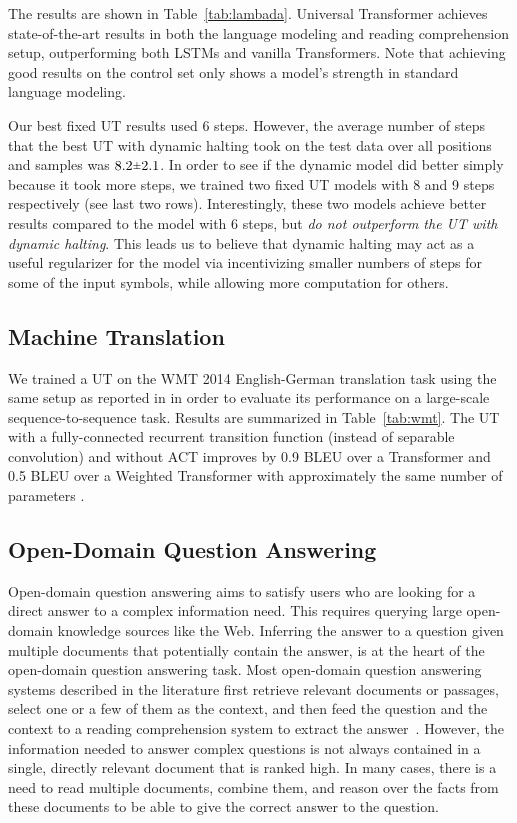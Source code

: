 

The results are shown in Table~\ref{tab:lambada}. Universal Transformer achieves state-of-the-art results in both the language modeling and reading comprehension setup, outperforming both LSTMs and vanilla Transformers. Note that achieving good results on the control set only shows a model's strength in standard language modeling.

Our best fixed UT results used 6 steps. However, the average number of steps that the best UT with dynamic halting took on the test data over all positions and samples was $8.2 \rpm 2.1$. In order to see if the dynamic model did better simply because it took more steps, we trained two fixed UT models with 8 and 9 steps respectively (see last two rows). Interestingly, these two models achieve better results compared to the model with 6 steps, but \emph{do not outperform the UT with dynamic halting}. This leads us to believe that dynamic halting may act as a useful regularizer for the model via incentivizing smaller numbers of steps for some of the input symbols, while allowing more computation for others.

\subsection{Machine Translation}
We trained a UT on the WMT 2014 English-German translation task using the same setup as reported in \citep{transformer} in order to evaluate its performance on a large-scale sequence-to-sequence task. Results are summarized in Table~\ref{tab:wmt}. The UT with a fully-connected recurrent transition function (instead of separable convolution) and without ACT improves by 0.9 BLEU over a Transformer and 0.5 BLEU over a Weighted Transformer with approximately the same number of parameters \citep{ahmed2017weighted}.



\subsection{Open-Domain Question Answering}
Open-domain question answering aims to satisfy users who are looking for a direct answer to a complex information need. 
This requires querying large open-domain knowledge sources like the Web. 
Inferring the answer to a question given multiple documents that potentially contain the answer, is at the heart of the open-domain question answering task. 
Most open-domain question answering systems described in the literature first retrieve relevant documents or passages, select one or a few of them as the context, and then feed the question and the context to a reading comprehension system to extract the answer~\citep{buck2017ask, chen2017reading, seo2016bidirectional, dhingra2016gated}. 
However, the information needed to answer complex questions is not always contained in a single, directly relevant document that is ranked high. In many cases, there is a need to read multiple documents, combine them, and reason over the facts from these documents to be able to give the correct answer to the question.

